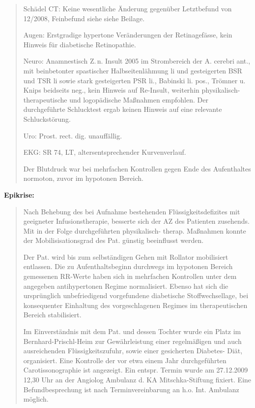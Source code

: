 {\begin{quote}
Schädel CT: Keine wesentliche Änderung gegenüber Letztbefund
von 12/2008, Feinbefund siehe siehe Beilage.

Augen: Erstgradige hypertone Veränderungen der
Retinagefässe, kein Hinweis
für diabetische
Retinopathie.

Neuro: Anamnestisch Z.\,n. Insult 2005 im Strombereich der
A. cerebri ant., mit beinbetonter spastischer Halbseitenlähmung
li und gesteigerten BSR und TSR li sowie stark gesteigerten
PSR li., Babinski li. pos., Trömner u. Knips
beidseits neg., kein Hinweis auf Re-Insult, weiterhin
physi\-ka\-lisch- thera\-peutische und logopädische
Maßnahmen empfohlen. Der durchgeführte Schlucktest ergab
keinen Hinweis auf eine relevante Schluckstörung.

Uro: Prost. rect. dig. unauffällig.

EKG: SR 74, LT, altersentsprechender Kurvenverlauf.

Der Blutdruck war bei mehrfachen Kontrollen gegen Ende des
Aufenthaltes normoton, zuvor im hypotonen Bereich.
\end{quote}




{\bfseries Epikrise:}

\begin{quote}
  Nach Behebung des bei Aufnahme bestehenden
  Flüssigkeitsdefizites mit geeigneter Infusionstherapie,
  besserte sich der AZ des Patienten zusehends. Mit in der
  Folge durchgeführten physi\-ka\-lisch- therap. Maßnahmen
  konnte der Mobilisisationsgrad des Pat. günstig
  beeinflusst werden.
  
  Der Pat. wird bis zum selbständigen Gehen mit Rollator
  mobilisiert entlassen. Die zu Aufenthaltsbeginn durchwegs
  im hypotonen Bereich gemessenen RR-Werte haben sich in
  mehrfachen Kontrollen unter dem angegeben antihypertonen
  Regime normalisiert. Ebenso hat sich die ursprünglich
  unbefriedigend vorgefundene diabetische Stoffwechsellage,
  bei konsequenter Einhaltung des vorgeschlagenen Regimes im
  therapeutischen Bereich stabilisiert.
  
  Im Einverständnis mit dem Pat. und dessen Tochter wurde
  ein Platz im Bernhard-Prischl-Heim zur Gewährleistung
  einer regelmäßigen und auch ausreichenden
  Flüssigkeitszufuhr, sowie einer gesicherten Diabetes-
  Diät, organisiert. Eine Kontrolle der vor etwa einem Jahr
  durchgeführten Carotissonographie ist
  angezeigt. Ein entspr. Termin wurde am 27.12.2009  12,30
  Uhr an der Angiolog Ambulanz d. KA Mitschka-Stiftung
  fixiert. Eine Befund\-be\-sprech\-ung ist nach
  Terminvereinbarung an h.o. Int. Ambulanz möglich.
\end{quote}

}
